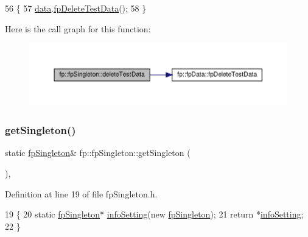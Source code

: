 \begin{DoxyCode}
56                                         \{
57                 \hyperlink{classfp_1_1fpSingleton_a2fa16ac6a0f66641749032eeee61b8e9}{data}.\hyperlink{classfp_1_1fpData_a996eedfc5ffe559ce1f6061af1efc1db}{fpDeleteTestData}();
58             \}
\end{DoxyCode}
Here is the call graph for this function\+:\nopagebreak
\begin{figure}[H]
\begin{center}
\leavevmode
\includegraphics[width=350pt]{classfp_1_1fpSingleton_aa4ac02c580b06ba16ed0160ec694438d_cgraph}
\end{center}
\end{figure}
\mbox{\label{classfp_1_1fpSingleton_a8bdae77b68521003e3fc630edec2e240}} 
\subsubsection{\texorpdfstring{get\+Singleton()}{getSingleton()}}
{\footnotesize\ttfamily static \hyperlink{classfp_1_1fpSingleton}{fp\+Singleton}\& fp\+::fp\+Singleton\+::get\+Singleton (\begin{DoxyParamCaption}{ }\end{DoxyParamCaption})\hspace{0.3cm}{\ttfamily [inline]}, {\ttfamily [static]}}



Definition at line 19 of file fp\+Singleton.\+h.


\begin{DoxyCode}
19                                               \{
20                 \textcolor{keyword}{static} \hyperlink{classfp_1_1fpSingleton_a049e41d4468d9b9f1e08788592c5f4cd}{fpSingleton}* \hyperlink{classfp_1_1fpSingleton_a0e2c02e7e7f730f59e5c1f10005d581c}{infoSetting}(\textcolor{keyword}{new} 
      \hyperlink{classfp_1_1fpSingleton_a049e41d4468d9b9f1e08788592c5f4cd}{fpSingleton});
21                 \textcolor{keywordflow}{return} *\hyperlink{classfp_1_1fpSingleton_a0e2c02e7e7f730f59e5c1f10005d581c}{infoSetting};
22             \}
\end{DoxyCode}
\mbox{\label{classfp_1_1fpSingleton_a86042ae6be6f59dfb90232678350011a}} 
